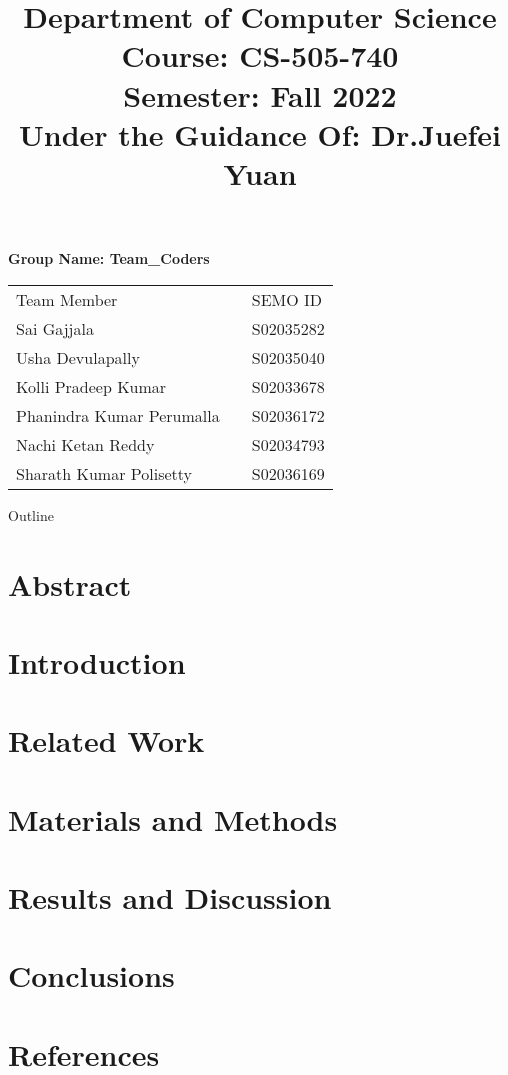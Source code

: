 \documentclass[9pt]{beamer}
\title[CS-505-740]{Department of Computer Science Course: CS-505-740\\Semester: Fall 2022\\Under the Guidance Of:  Dr.Juefei Yuan} %
\author[]{ 
} %
\institute[]{\large South East Missouri State University}
\date{}
\begin{document}

\begin{frame}[plain]
    \maketitle
    \centering\textbf{Group Name: Team\_Coders\\}
    \begin{table}[]
        \begin{tabular}{lll}
        Team Member               &  & SEMO ID   \\
        Sai Gajjala               &  & S02035282 \\
        Usha Devulapally          &  & S02035040 \\
        Kolli Pradeep Kumar       &  & S02033678 \\
        Phanindra Kumar Perumalla &  & S02036172 \\
        Nachi Ketan Reddy         &  & S02034793 \\
        Sharath Kumar Polisetty   &  & S02036169
        \end{tabular}
    \end{table}
    
\end{frame}


\begin{frame}{Outline}
  \tableofcontents
\end{frame}

\section{Abstract}
    
\section{Introduction}
    
\section{Related Work}
    
\section{Materials and Methods}
    
\section{Results and Discussion}
    
\section{Conclusions}
    
\section{References}
    
\end{document}
